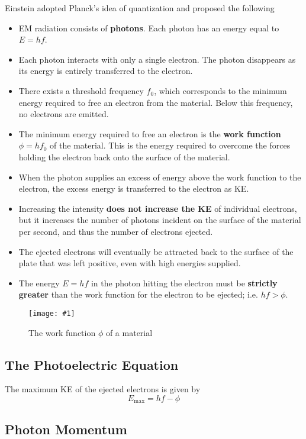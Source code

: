 \documentclass[a4paper,12pt]{article}
\newcommand{\img}[4]{\begin{center}
  \begin{figure}[H]
    \centering
    \texttt{[image: \#1]}
    \caption{#3}
    \label{fig:#4}
  \end{figure}
\end{center}}
\begin{document}
Einstein adopted Planck's idea of quantization and proposed the following
\begin{itemize}
  \item EM radiation consists of \textbf{photons}. Each photon has an energy equal to $E = hf$.
  \item Each photon interacts with only a single electron. The photon disappears as its energy is entirely transferred to the electron.
  \item There exists a threshold frequency $f_0$, which corresponds to the minimum energy required to free an electron from the material. Below this frequency, no electrons are emitted.
  \item The minimum energy required to free an electron is the \textbf{work function} $\phi = hf_0$ of the material. This is the energy required to overcome the forces holding the electron back onto the surface of the material.
  \item When the photon supplies an excess of energy above the work function to the electron, the excess energy is transferred to the electron as KE.
  \item Increasing the intensity \textbf{does not increase the KE} of individual electrons, but it increases the number of photons incident on the surface of the material per second, and thus the number of electrons ejected.
  \item The ejected electrons will eventually be attracted back to the surface of the plate that was left positive, even with high energies supplied.
  \item The energy $E = hf$ in the photon hitting the electron must be \textbf{strictly greater} than the work function for the electron to be ejected; i.e. $hf > \phi$.
\end{itemize}

\img{workfunction.png}{1}{The work function $\phi$ of a material}{workfunction}

\subsection{The Photoelectric Equation}

The maximum KE of the ejected electrons is given by
\begin{equation}\label{eq:photoelectric}
  E_{\text{max}} = hf - \phi
\end{equation}


\subsection{Photon Momentum}
\end{document}
